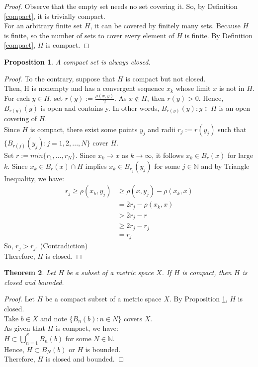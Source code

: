 \documentclass[12pt, reqno]{amsart}
\newtheorem{theorem}{Theorem}[section]
\newtheorem{proposition}[theorem]{Proposition}
\theoremstyle{definition}
\numberwithin{equation}{section}
\newcommand{\dN}{{\mathbb N}}
\begin{document}
\begin{proof}
Observe that the empty set needs no set covering it. So, by Definition \ref{compact}, it is trivially compact.\\
For an arbitrary finite set $H$, it can be covered by finitely many sets. Because $H$ is finite, so the number of sets to cover every element of $H$ is finite. By Definition \ref{compact}, $H$ is compact.
\end{proof}
\pagebreak
\begin{proposition} \label{closed compact}\cite{s1}
\textit{A compact set is always closed.}
\end{proposition}
\begin{proof}
    To the contrary, suppose that $H$ is compact but not closed.\\
    Then, H is nonempty and has a convergent sequence $x_k$ whose limit $x$ is not in $H$.\\
    For each $y \in H$, set $r(y) := \frac{\rho(x,y)}{2}$. As $x \notin H$, then $r(y)>0$. Hence, $B_{r(y)}(y)$ is open and contains y. In other words, $B_{r(y)}(y): y \in H$ is an open covering of $H$.\\
    Since $H$ is compact, there exist some points $y_j$ and radii $r_j := r(y_j)$ such that $\{B_{r(j)}(y_j) : j=1,2,...,N\}$ cover $H$.\\
    Set $r := min\{r_1,...,r_N\}$. Since $x_k \rightarrow x$ as $k \rightarrow \infty$, it follows $x_k \in B_r(x)$ for large $k$. Since $x_k \in B_r(x) \cap H$ implies $x_k \in B_{r_j}(y_j)$ for some $j \in \dN$ and by Triangle Inequality, we have:
    \begin{align*}
    r_j \geq \rho(x_k,y_j) &\geq \rho(x,y_j) - \rho(x_k,x)\\
                           &= 2r_j - \rho(x_k,x)\\
                           &> 2r_j - r\\
                           &\geq 2r_j - r_j\\
                           &= r_j
    \end{align*}
    So, $r_j > r_j$. (Contradiction)\\
    Therefore, $H$ is closed.
\end{proof}
\begin{theorem} \label{compact closed bounded}\cite{s1}
Let $H$ be a subset of a metric space $X$. If $H$ is compact, then $H$ is closed and bounded.
\end{theorem}
\begin{proof}
Let $H$ be a compact subset of a metric space $X$. By Proposition \ref{closed compact}, $H$ is closed.\\
Take $b \in X$ and note $\{B_n(b):n \in N\}$ covers $X$.\\
As given that $H$ is compact, we have:\\
\hspace*{4.5cm} $H \subset \bigcup_{n=1} ^{^N}B_n(b)$ for some $N \in \dN$.\\
Hence, $H \subset B_N(b)$ or $H$ is bounded.\\
Therefore, $H$ is closed and bounded.
\end{proof}
\end{document}
